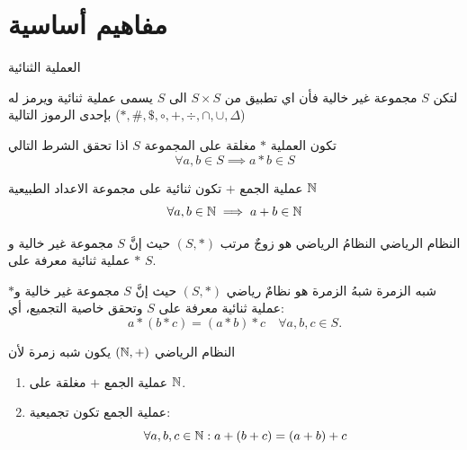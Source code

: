 \chapter{مفاهيم أساسية}


\begin{definition}{العملية الثنائية}{\cite{ref1}}
	لتكن $S$ مجموعة غير خالية فأن اي تطبيق من 
	$S \times S$ الى $S$ يسمى عملية ثنائية ويرمز له بإحدى الرموز التالية
	($*, \#, \$, \circ, + , \div, \cap, \cup, \Delta$) 
\end{definition}

\begin{note}
	تكون العملية $*$ مغلقة على المجموعة $S$ اذا تحقق الشرط التالي
	\[
	\forall a, b\in S \implies a * b \in S
	\]
\end{note}

\begin{example}
	عملية الجمع $+$ تكون ثنائية على مجموعة الاعداد الطبيعية $\mathbb{N}$ 
	\[
	\forall a, b \in \mathbb{N} \implies a + b \in \mathbb{N}
	\]
\end{example}


\begin{definition}{النظام الرياضي}{\cite{ref1}}
	النظامُ الرياضي هو زوجٌ مرتب $(S, *)$ حيث إنَّ $S$ مجموعة غير خالية و$*$ عملية ثنائية معرفة على $S$.
\end{definition}

\begin{definition}{شبه الزمرة}{\cite{ref1}}
	شبهُ الزمرة هو نظامٌ رياضي $(S, *)$ حيث إنَّ $S$ مجموعة غير خالية و$*$ عملية ثنائية معرفة على $S$ وتحقق خاصية التجميع، أي:
	\[
	a * (b * c) = (a * b) * c \quad \forall a, b, c \in S.
	\]
\end{definition}

\begin{example}
	النظام الرياضي $(\mathbb{N}, +)$ يكون شبه زمرة لأن
	\begin{enumerate}[nosep]
		\item عملية الجمع $+$ مغلقة على $\mathbb{N}$.
		\item عملية الجمع تكون تجميعية:
		\[
		\forall a, b, c\in \mathbb{N} : a + (b + c) = (a + b) + c 
		\]
	\end{enumerate}
\end{example}

